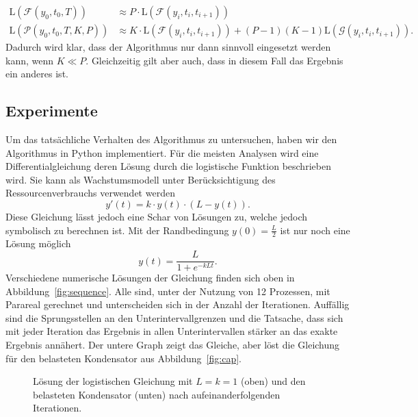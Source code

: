 \begin{align*}
    \mathrm{L}\!\left(\mathcal{F}\!\!\left(y_0, t_0, T\right)\right)
    &\approx P \cdot \mathrm{L}\!\left(\mathcal{F}\!\!\left(y_i, t_i, t_{i+1}\right)\right)\\
    \mathrm{L}\!\left(\mathcal{P}\!\!\left(y_0, t_0, T, K, P\right)\right)
    &\approx K \cdot \mathrm{L}\!\left(\mathcal{F}\!\!\left(y_i, t_i, t_{i+1}\right)\right) + (P-1) (K-1) \mathrm{L}\!\left(\mathcal{G}\!\!\left(y_i, t_i, t_{i+1}\right)\right).
\end{align*}
Dadurch wird klar, dass der Algorithmus nur dann sinnvoll eingesetzt werden kann, wenn \(K \ll P\). Gleichzeitig gilt aber auch, dass in diesem Fall das Ergebnis ein anderes ist.
\subsection*{Experimente}
Um das tatsächliche Verhalten des Algorithmus zu untersuchen, haben wir den Algorithmus in Python implementiert. Für die meisten Analysen wird eine Differentialgleichung deren Lösung durch die logistische Funktion beschrieben wird. Sie kann als Wachstumsmodell unter Berücksichtigung des Ressourcenverbrauchs verwendet werden
\begin{displaymath}
    y'(t) = k \cdot y(t) \cdot (L - y(t)).
\end{displaymath}
Diese Gleichung lässt jedoch eine Schar von Lösungen zu, welche jedoch symbolisch zu berechnen ist. Mit der Randbedingung \(y(0)= \frac{L}{2}\) ist nur noch eine Lösung möglich
\begin{displaymath}
    y(t) = \frac{L}{1+e^{-k L t}}.
\end{displaymath}
Verschiedene numerische Lösungen der Gleichung finden sich oben in Abbildung~\ref{fig:sequence}. Alle sind, unter der Nutzung von 12 Prozessen, mit Parareal gerechnet und unterscheiden sich in der Anzahl der Iterationen. Auffällig sind die Sprungsstellen an den Unterintervallgrenzen und die Tatsache, dass sich mit jeder Iteration das Ergebnis in allen Unterintervallen stärker an das exakte Ergebnis annähert. Der untere Graph zeigt das Gleiche, aber löst die Gleichung für den belasteten Kondensator aus Abbildung~\ref{fig:cap}.
\begin{figure}[ht]
    \centering
        
        
    \caption{Lösung der logistischen Gleichung mit \(L = k = 1\) (oben) und den belasteten Kondensator (unten) nach aufeinanderfolgenden Iterationen.}
    \label{fig:iters_log}
\end{figure}
